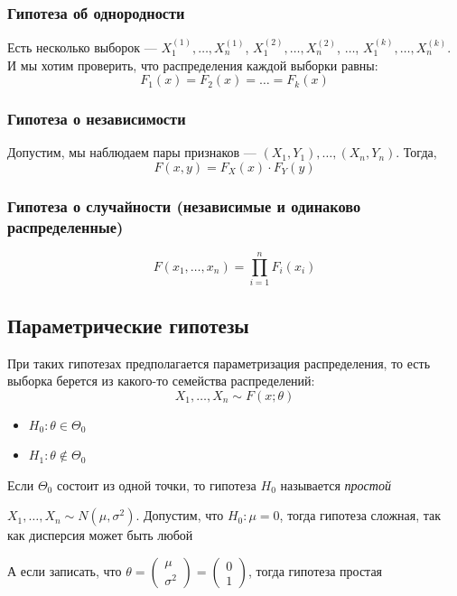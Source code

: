 \documentclass[a4paper, 10pt]{article}
\begin{document}
\subsubsection{Гипотеза об однородности}
Есть несколько выборок — $X_1^{(1)},\ldots,X_n^{(1)}$, $X_1^{(2)},\ldots,X_n^{(2)}$, $\ldots$, $X_1^{(k)},\ldots,X_n^{(k)}$. И мы хотим проверить, что распределения каждой выборки равны:
\begin{equation*}
    F_1(x)=F_2(x)=\ldots=F_k(x)
\end{equation*}

\subsubsection{Гипотеза о независимости}
Допустим, мы наблюдаем пары признаков — $(X_1,Y_1),\ldots,(X_n,Y_n)$. Тогда,
\begin{equation*}
    F(x,y)=F_{X}(x)\cdot F_{Y}(y)
\end{equation*}

\subsubsection{Гипотеза о случайности (независимые и одинаково распределенные)}
\begin{equation*}
    F(x_1,\ldots,x_n)=\prod_{i=1}^n F_i(x_i)
\end{equation*}

\subsection{Параметрические гипотезы}
При таких гипотезах предполагается параметризация распределения, то есть выборка берется из какого-то семейства распределений:
\begin{equation*}
    X_1,\ldots,X_n\sim F(x;\theta)
\end{equation*}
\begin{itemize}
    \item $H_0:\theta\in\Theta_0$
    \item $H_1:\theta\not\in\Theta_0$
\end{itemize}

 Если $\Theta_0$ состоит из одной точки, то гипотеза $H_0$ называется \textit{простой}

\ex $X_1,\ldots,X_n\sim N(\mu,\sigma^2).$ Допустим, что $H_0:\mu=0$, тогда гипотеза сложная, так как дисперсия может быть любой

А если записать, что $\theta=\begin{pmatrix}
    \mu\\
    \sigma^2
\end{pmatrix}=\begin{pmatrix}
    0\\
    1
\end{pmatrix}$, тогда гипотеза простая
\end{document}
